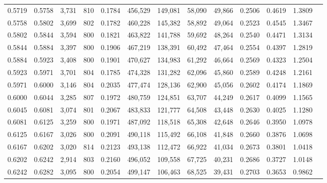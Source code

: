 \begin{tabular}{rrrrrrrrrrrrr}
0.5719 & 0.5758 &  3,731 &   810 &                                     0.1784 & 456,529 & 149,081 &  58,090 &  49,866 & 0.2506 & 0.4619 & 1.3809 \\
0.5758 & 0.5802 &  3,699 &   802 &                                     0.1782 & 460,228 & 145,382 &  58,892 &  49,064 & 0.2523 & 0.4545 & 1.3467 \\
0.5802 & 0.5844 &  3,594 &   800 &                                     0.1821 & 463,822 & 141,788 &  59,692 &  48,264 & 0.2540 & 0.4471 & 1.3134 \\
0.5844 & 0.5884 &  3,397 &   800 &                                     0.1906 & 467,219 & 138,391 &  60,492 &  47,464 & 0.2554 & 0.4397 & 1.2819 \\
0.5884 & 0.5923 &  3,408 &   800 &                                     0.1901 & 470,627 & 134,983 &  61,292 &  46,664 & 0.2569 & 0.4323 & 1.2504 \\
0.5923 & 0.5971 &  3,701 &   804 &                                     0.1785 & 474,328 & 131,282 &  62,096 &  45,860 & 0.2589 & 0.4248 & 1.2161 \\
0.5971 & 0.6000 &  3,146 &   804 &                                     0.2035 & 477,474 & 128,136 &  62,900 &  45,056 & 0.2602 & 0.4174 & 1.1869 \\
0.6000 & 0.6044 &  3,285 &   807 &                                     0.1972 & 480,759 & 124,851 &  63,707 &  44,249 & 0.2617 & 0.4099 & 1.1565 \\
0.6045 & 0.6081 &  3,074 &   801 &                                     0.2067 & 483,833 & 121,777 &  64,508 &  43,448 & 0.2630 & 0.4025 & 1.1280 \\
0.6081 & 0.6125 &  3,259 &   800 &                                     0.1971 & 487,092 & 118,518 &  65,308 &  42,648 & 0.2646 & 0.3950 & 1.0978 \\
0.6125 & 0.6167 &  3,026 &   800 &                                     0.2091 & 490,118 & 115,492 &  66,108 &  41,848 & 0.2660 & 0.3876 & 1.0698 \\
0.6167 & 0.6202 &  3,020 &   814 &                                     0.2123 & 493,138 & 112,472 &  66,922 &  41,034 & 0.2673 & 0.3801 & 1.0418 \\
0.6202 & 0.6242 &  2,914 &   803 &                                     0.2160 & 496,052 & 109,558 &  67,725 &  40,231 & 0.2686 & 0.3727 & 1.0148 \\
0.6242 & 0.6282 &  3,095 &   800 &                                     0.2054 & 499,147 & 106,463 &  68,525 &  39,431 & 0.2703 & 0.3653 & 0.9862 \\

\end{tabular}
